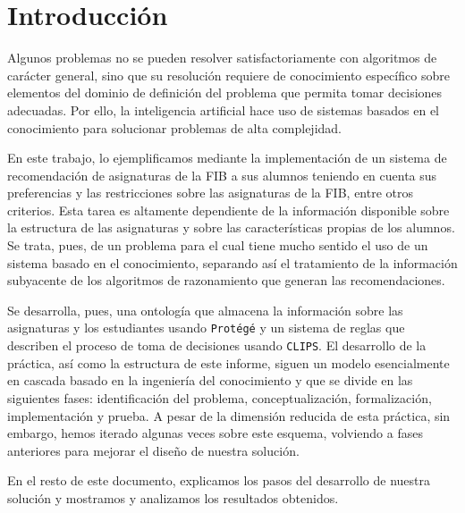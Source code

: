 
\section{Introducción} \label{sec:intro}

Algunos problemas no se pueden resolver satisfactoriamente con algoritmos de
carácter general, sino que su resolución requiere de conocimiento específico 
sobre elementos del dominio de definición del problema que permita tomar 
decisiones adecuadas. Por ello, la inteligencia artificial hace uso de 
sistemas basados en el conocimiento para solucionar problemas de alta 
complejidad.

En este trabajo, lo ejemplificamos mediante la implementación de un sistema 
de recomendación de asignaturas de la FIB a sus alumnos teniendo en cuenta sus 
preferencias y las restricciones sobre las asignaturas de la FIB, entre otros 
criterios. Esta tarea es altamente dependiente de la información disponible 
sobre la estructura de las asignaturas y sobre las características propias de 
los alumnos. Se trata, pues, de un problema para el cual tiene mucho sentido 
el uso de un sistema basado en el conocimiento, separando así el tratamiento 
de la información subyacente de los algoritmos de razonamiento que generan 
las recomendaciones.

Se desarrolla, pues, una ontología que almacena la información sobre las 
asignaturas y los estudiantes usando \texttt{Protégé} y un sistema de reglas 
que describen el proceso de toma de decisiones usando \texttt{CLIPS}. El 
desarrollo de la práctica, así como la estructura de este informe, siguen un 
modelo esencialmente en cascada basado en la ingeniería del conocimiento y 
que se divide en las siguientes fases: identificación del problema, 
conceptualización, formalización, implementación y prueba. A pesar de la 
dimensión reducida de esta práctica, sin embargo, hemos iterado algunas veces 
sobre este esquema, volviendo a fases anteriores para mejorar el diseño de 
nuestra solución.

En el resto de este documento, explicamos los pasos del desarrollo de nuestra 
solución y mostramos y analizamos los resultados obtenidos.

\clearpage


